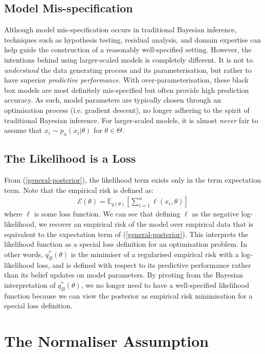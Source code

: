 \documentclass[twoside,11pt]{article}
\begin{document}
\subsection{Model Mis-specification}
Although model mis-specification occurs in traditional Bayesian inference, techniques such as hypothesis testing, residual analysis, and domain expertise can help guide the construction of a reasonably well-specified setting. However, the intentions behind using larger-scaled models is completely different. It is not to \textit{understand} the data generating process and its parameterisation, but rather to have superior \textit{predictive performance}. With over-parameterisation, these black box models are most definitely mis-specified but often provide high prediction accuracy. As such, model parameters are typically chosen through an optimisation process (i.e. gradient descent), no longer adhering to the spirit of traditional Bayesian inference. For larger-scaled models, it is almost \textit{never} fair to assume that $x_i \sim p_n(x_i|\theta)$ for  $\theta \in \Theta$.
\subsection{The Likelihood is a Loss}
From (\ref{general-posterior}), the likelihood term exists only in the term expectation term. Note that the empirical risk is defined as:
\begin{align}
\mathcal{E}(\theta) = \mathbb{E}_{q(\theta)}\left[\sum_{i=1}^n \ell\left(x_i, \theta\right)\right]
\label{empirical-risk}
\end{align}
where $\ell$ is some loss function. We can see that defining $\ell$ as the negative log-likelihood, we recover an empirical risk of the model over empirical data that is equivalent to the expectation term of (\ref{general-posterior}). This interprets the likelihood function as a special loss definition for an optimisation problem. In other words, $q_B^*(\theta)$ is the minimiser of a regularised empirical risk with a log-likelihood loss, and is defined with respect to its predictive performance rather than its belief updates on model parameters. By pivoting from the Bayesian interpretation of $q_B^*(\theta)$, we no longer need to have a well-specified likelihood function because we can view the posterior as empirical risk minimisation for a special loss definition.

\section{The Normaliser Assumption}\label{sec:normaliser}
\end{document}
